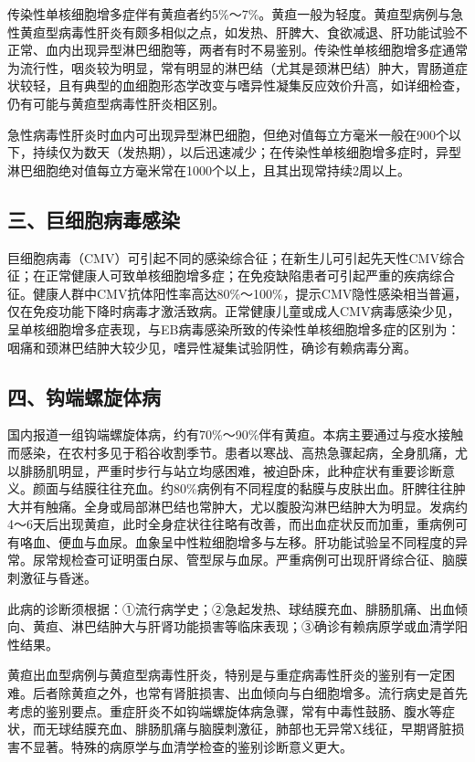 传染性单核细胞增多症伴有黄疸者约5\%～7\%。黄疸一般为轻度。黄疸型病例与急性黄疸型病毒性肝炎有颇多相似之点，如发热、肝脾大、食欲减退、肝功能试验不正常、血内出现异型淋巴细胞等，两者有时不易鉴别。传染性单核细胞增多症通常为流行性，咽炎较为明显，常有明显的淋巴结（尤其是颈淋巴结）肿大，胃肠道症状较轻，且有典型的血细胞形态学改变与嗜异性凝集反应效价升高，如详细检查，仍有可能与黄疸型病毒性肝炎相区别。

急性病毒性肝炎时血内可出现异型淋巴细胞，但绝对值每立方毫米一般在900个以下，持续仅为数天（发热期），以后迅速减少；在传染性单核细胞增多症时，异型淋巴细胞绝对值每立方毫米常在1000个以上，且其出现常持续2周以上。

\subsection{三、巨细胞病毒感染}

巨细胞病毒（CMV）可引起不同的感染综合征；在新生儿可引起先天性CMV综合征；在正常健康人可致单核细胞增多症；在免疫缺陷患者可引起严重的疾病综合征。健康人群中CMV抗体阳性率高达80\%～100\%，提示CMV隐性感染相当普遍，仅在免疫功能下降时病毒才激活致病。正常健康儿童或成人CMV病毒感染少见，呈单核细胞增多症表现，与EB病毒感染所致的传染性单核细胞增多症的区别为：咽痛和颈淋巴结肿大较少见，嗜异性凝集试验阴性，确诊有赖病毒分离。

\subsection{四、钩端螺旋体病}

国内报道一组钩端螺旋体病，约有70\%～90\%伴有黄疸。本病主要通过与疫水接触而感染，在农村多见于稻谷收割季节。患者以寒战、高热急骤起病，全身肌痛，尤以腓肠肌明显，严重时步行与站立均感困难，被迫卧床，此种症状有重要诊断意义。颜面与结膜往往充血。约80\%病例有不同程度的黏膜与皮肤出血。肝脾往往肿大并有触痛。全身或局部淋巴结也常肿大，尤以腹股沟淋巴结肿大为明显。发病约4～6天后出现黄疸，此时全身症状往往略有改善，而出血症状反而加重，重病例可有咯血、便血与血尿。血象呈中性粒细胞增多与左移。肝功能试验呈不同程度的异常。尿常规检查可证明蛋白尿、管型尿与血尿。严重病例可出现肝肾综合征、脑膜刺激征与昏迷。

此病的诊断须根据：①流行病学史；②急起发热、球结膜充血、腓肠肌痛、出血倾向、黄疸、淋巴结肿大与肝肾功能损害等临床表现；③确诊有赖病原学或血清学阳性结果。

黄疸出血型病例与黄疸型病毒性肝炎，特别是与重症病毒性肝炎的鉴别有一定困难。后者除黄疸之外，也常有肾脏损害、出血倾向与白细胞增多。流行病史是首先考虑的鉴别要点。重症肝炎不如钩端螺旋体病急骤，常有中毒性鼓肠、腹水等症状，而无球结膜充血、腓肠肌痛与脑膜刺激征，肺部也无异常X线征，早期肾脏损害不显著。特殊的病原学与血清学检查的鉴别诊断意义更大。

